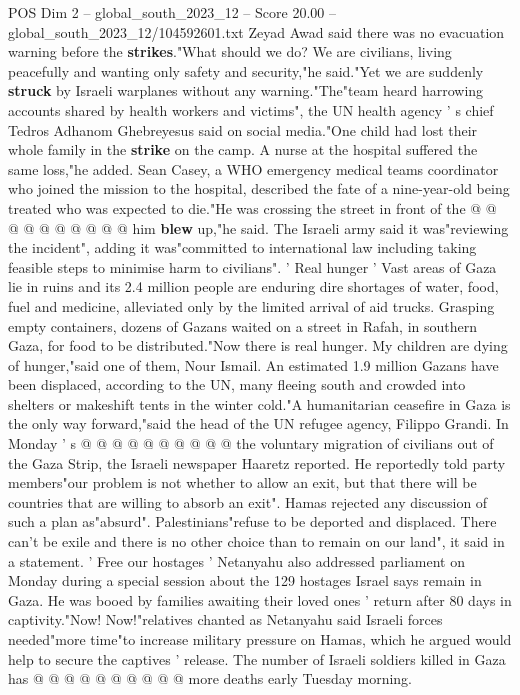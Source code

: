 \begin{textsample}{POS Dim 2 – global\_south\_2023\_12 – Score 20.00 – global\_south\_2023\_12/104592601.txt}
Zeyad Awad said there was no evacuation warning before the \textbf{strikes}."What should we do?
We are civilians, living peacefully and wanting only safety and security,"he said."Yet we are suddenly \textbf{struck} by Israeli warplanes without any warning."The"team heard harrowing accounts shared by health workers and victims", the UN health agency ' s chief Tedros Adhanom Ghebreyesus said on social media."One child had lost their whole family in the \textbf{strike} on the camp.
A nurse at the hospital suffered the same loss,"he added.
Sean Casey, a WHO emergency medical teams coordinator who joined the mission to the hospital, described the fate of a nine-year-old being treated who was expected to die."He was crossing the street in front of the @ @ @ @ @ @ @ @ @ @ him \textbf{blew} up,"he said.
The Israeli army said it was"reviewing the incident", adding it was"committed to international law including taking feasible steps to minimise harm to civilians". ' Real hunger ' Vast areas of Gaza lie in ruins and its 2.4 million people are enduring dire shortages of water, food, fuel and medicine, alleviated only by the limited arrival of aid trucks.
Grasping empty containers, dozens of Gazans waited on a street in Rafah, in southern Gaza, for food to be distributed."Now there is real hunger.
My children are dying of hunger,"said one of them, Nour Ismail.
An estimated 1.9 million Gazans have been displaced, according to the UN, many fleeing south and crowded into shelters or makeshift tents in the winter cold."A humanitarian ceasefire in Gaza is the only way forward,"said the head of the UN refugee agency, Filippo Grandi.
In Monday ' s @ @ @ @ @ @ @ @ @ @ the voluntary migration of civilians out of the Gaza Strip, the Israeli newspaper Haaretz reported.
He reportedly told party members"our problem is not whether to allow an exit, but that there will be countries that are willing to absorb an exit".
Hamas rejected any discussion of such a plan as"absurd".
Palestinians"refuse to be deported and displaced.
There can't be exile and there is no other choice than to remain on our land", it said in a statement. ' Free our hostages ' Netanyahu also addressed parliament on Monday during a special session about the 129 hostages Israel says remain in Gaza.
He was booed by families awaiting their loved ones ' return after 80 days in captivity."Now!
Now!"relatives chanted as Netanyahu said Israeli forces needed"more time"to increase military pressure on Hamas, which he argued would help to secure the captives ' release.
The number of Israeli soldiers killed in Gaza has @ @ @ @ @ @ @ @ @ @ more deaths early Tuesday morning.

\end{textsample}

